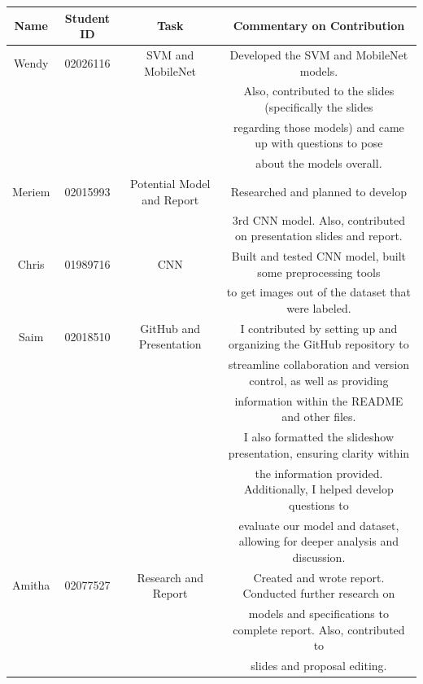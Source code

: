 \documentclass{article}
\theoremstyle{plain}
\theoremstyle{definition}
\theoremstyle{remark}
\begin{document}
\begin{table}
    \centering
    \begin{tabular}{| c | c | c | c |}
        \hline
        \textbf{Name} & \textbf{Student ID} & \textbf{Task} & \textbf{Commentary on Contribution} \\
        \hline
        Wendy & 02026116 & SVM and MobileNet & Developed the SVM and MobileNet models. \\ 
        & & & Also, contributed to the slides (specifically the slides \\
        & & & regarding those models) and came up with questions to pose \\
        & & & about the models overall. \\
        \hline
        Meriem & 02015993 & Potential Model and Report & Researched and planned to develop \\
        & & & 3rd CNN model. Also, contributed on presentation slides and report. \\
        \hline
        Chris & 01989716 & CNN & Built and tested CNN model, built some preprocessing tools \\
        & & & to get images out of the dataset that were labeled.\\
        \hline
        Saim & 02018510 & GitHub and Presentation & I contributed by setting up and organizing the GitHub repository to  \\
        & & & streamline collaboration and version control, as well as providing \\
        & & & information within the README and other files. \\
        & & & I also formatted the slideshow presentation, ensuring clarity within\\
        & & & the information provided. Additionally, I helped develop questions to \\
        & & & evaluate our model and dataset, allowing for deeper analysis and discussion. \\
        \hline
        Amitha & 02077527 & Research and Report & Created and wrote report. Conducted further research on \\ 
        & & & models and specifications to complete report. Also, contributed to \\
        & & & slides and proposal editing. \\
        \hline
    \end{tabular}
\end{table}
\end{document}

